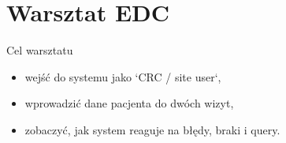 \section{Warsztat EDC}

\begin{frame}{Cel warsztatu}
  \begin{itemize}
    \item wejść do systemu jako `CRC / site user`,
    \item wprowadzić dane pacjenta do dwóch wizyt,
    \item zobaczyć, jak system reaguje na błędy, braki i query.
  \end{itemize}
\end{frame}



